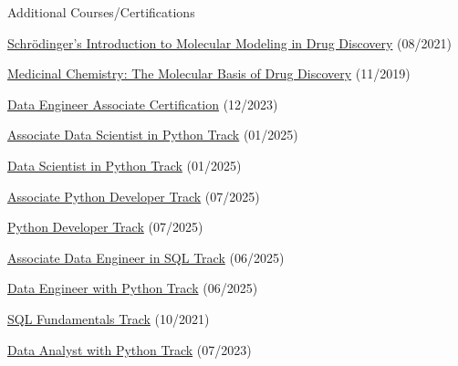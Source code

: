 \begin{cventries}
  \cventry
    {}
    {Additional Courses/Certifications}
    {}
    {}
    {
        \begin{cvitems}
            \item{\href{https://api.badgr.io/public/assertions/zZ7-bHnkTcm6H_UNr2s-LA}{Schrödinger's Introduction to Molecular Modeling in Drug Discovery} (08/2021)}           
            \item{\href{https://courses.edx.org/certificates/27307d91954041dab94af0ff554bc378}{Medicinal Chemistry: The Molecular Basis of Drug Discovery} (11/2019)}
            \item{\href{https://www.datacamp.com/certificate/DEA0011913814162}{Data Engineer Associate Certification} (12/2023)}
            \item{\href{https://www.datacamp.com/completed/statement-of-accomplishment/track/001ce60122d90d6117abb37e6b959eff79810b59}{Associate Data Scientist in Python Track} (01/2025)}
            \item{\href{https://www.datacamp.com/completed/statement-of-accomplishment/track/f94f0703ec170e3314fb2054504a159a3dd7c7ee}{Data Scientist in Python Track} (01/2025)}
            \item{\href{https://www.datacamp.com/completed/statement-of-accomplishment/track/c98b855d03b9d4f5d9d519c262cd3d19dde3720c}{Associate Python Developer Track} (07/2025)}
            \item{\href{https://www.datacamp.com/completed/statement-of-accomplishment/track/0b3efc0a607d3b58c46cdfa55888f0de34dbe0fc}{Python Developer Track} (07/2025)}
            \item{\href{https://www.datacamp.com/completed/statement-of-accomplishment/track/ddd62c1f2ec3bfe472fa8be68f9cba3861cee587}{Associate Data Engineer in SQL Track} (06/2025)}
            \item{\href{https://www.datacamp.com/completed/statement-of-accomplishment/track/bd98710517291375d82b436a14bc7a9120a5945a}{Data Engineer with Python Track} (06/2025)}
            \item{\href{https://www.datacamp.com/statement-of-accomplishment/track/941904e6394e2951693441d466f4643e5edfb4de}{SQL Fundamentals Track} (10/2021)}
            \item{\href{https://www.datacamp.com/completed/statement-of-accomplishment/track/4d9fb22f2514baecb5866aecd4421ba951e418a1}{Data Analyst with Python Track} (07/2023)}

\end{cvitems}}
\end{cventries}
